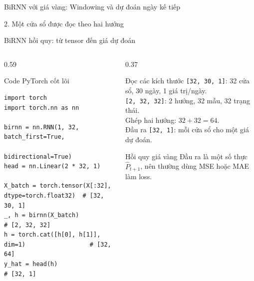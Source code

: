 \documentclass[aspectratio=169, 10pt]{beamer}
\begin{document}
\begin{frame}[fragile]{BiRNN với giá vàng: Windowing và dự đoán ngày kế tiếp}
\begin{block}{2. Một cửa sổ được đọc theo hai hướng}
\begin{center}
\end{center}
\end{block}

\end{frame}

\begin{frame}[fragile]{BiRNN hồi quy: từ tensor đến giá dự đoán}
\small
\begin{columns}[T]
\begin{column}{0.59\textwidth}
\begin{block}{Code PyTorch cốt lõi}
\begin{lstlisting}[style=rnnpython]
import torch
import torch.nn as nn

birnn = nn.RNN(1, 32, batch_first=True,
               bidirectional=True)
head = nn.Linear(2 * 32, 1)

X_batch = torch.tensor(X[:32], dtype=torch.float32)  # [32, 30, 1]
_, h = birnn(X_batch)                                # [2, 32, 32]
h = torch.cat([h[0], h[1]], dim=1)                  # [32, 64]
y_hat = head(h)                                     # [32, 1]
\end{lstlisting}
\end{block}
\end{column}

\begin{column}{0.37\textwidth}
\begin{exampleblock}{Đọc các kích thước}
\scriptsize
\texttt{[32, 30, 1]}: 32 cửa sổ, 30 ngày, 1 giá trị/ngày.\\[2pt]
\texttt{[2, 32, 32]}: 2 hướng, 32 mẫu, 32 trạng thái.\\[2pt]
Ghép hai hướng: \(32+32=64\).\\[2pt]
Đầu ra \texttt{[32, 1]}: mỗi cửa sổ cho một giá dự đoán.
\end{exampleblock}

\begin{alertblock}{Hồi quy giá vàng}
Đầu ra là một số thực \(\widehat P_{t+1}\), nên thường dùng MSE hoặc MAE làm loss.
\end{alertblock}
\end{column}
\end{columns}


\end{frame}
\end{document}
